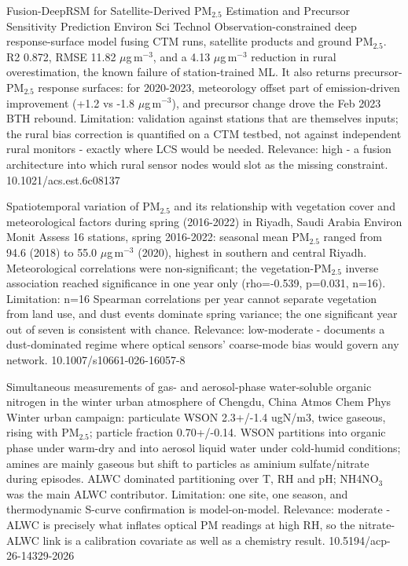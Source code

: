 \documentclass[10pt]{article}
\begin{document}
{Fusion-DeepRSM for Satellite-Derived PM$_{2.5}$ Estimation and Precursor Sensitivity Prediction}
{Environ Sci Technol}
{Observation-constrained deep response-surface model fusing CTM runs, satellite products and ground PM$_{2.5}$. R2 0.872, RMSE 11.82 $\mu$g\,m$^{-3}$, and a 4.13 $\mu$g\,m$^{-3}$ reduction in rural overestimation, the known failure of station-trained ML. It also returns precursor-PM$_{2.5}$ response surfaces: for 2020-2023, meteorology offset part of emission-driven improvement (+1.2 vs -1.8 $\mu$g\,m$^{-3}$), and precursor change drove the Feb 2023 BTH rebound. Limitation: validation against stations that are themselves inputs; the rural bias correction is quantified on a CTM testbed, not against independent rural monitors - exactly where LCS would be needed. Relevance: high - a fusion architecture into which rural sensor nodes would slot as the missing constraint.}
{10.1021/acs.est.6c08137}

{Spatiotemporal variation of PM$_{2.5}$ and its relationship with vegetation cover and meteorological factors during spring (2016-2022) in Riyadh, Saudi Arabia}
{Environ Monit Assess}
{16 stations, spring 2016-2022: seasonal mean PM$_{2.5}$ ranged from 94.6 (2018) to 55.0 $\mu$g\,m$^{-3}$ (2020), highest in southern and central Riyadh. Meteorological correlations were non-significant; the vegetation-PM$_{2.5}$ inverse association reached significance in one year only (rho=-0.539, p=0.031, n=16). Limitation: n=16 Spearman correlations per year cannot separate vegetation from land use, and dust events dominate spring variance; the one significant year out of seven is consistent with chance. Relevance: low-moderate - documents a dust-dominated regime where optical sensors' coarse-mode bias would govern any network.}
{10.1007/s10661-026-16057-8}

{Simultaneous measurements of gas- and aerosol-phase water-soluble organic nitrogen in the winter urban atmosphere of Chengdu, China}
{Atmos Chem Phys}
{Winter urban campaign: particulate WSON 2.3+/-1.4 ugN/m3, twice gaseous, rising with PM$_{2.5}$; particle fraction 0.70+/-0.14. WSON partitions into organic phase under warm-dry and into aerosol liquid water under cold-humid conditions; amines are mainly gaseous but shift to particles as aminium sulfate/nitrate during episodes. ALWC dominated partitioning over T, RH and pH; NH4NO$_3$ was the main ALWC contributor. Limitation: one site, one season, and thermodynamic S-curve confirmation is model-on-model. Relevance: moderate - ALWC is precisely what inflates optical PM readings at high RH, so the nitrate-ALWC link is a calibration covariate as well as a chemistry result.}
{10.5194/acp-26-14329-2026}
\end{document}
